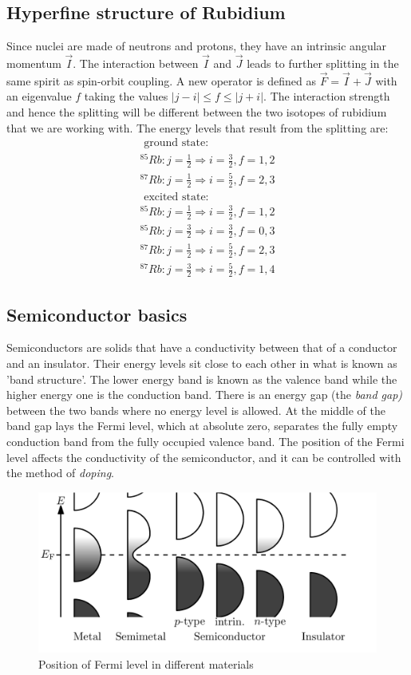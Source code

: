 \documentclass{article}
\begin{document}
\subsection{Hyperfine structure of Rubidium}

Since nuclei are made of neutrons and protons, they have an intrinsic angular momentum $\vec{I}$. The interaction between $\vec{I}$ and $\vec{J}$ leads to further splitting in the same spirit as spin-orbit coupling. A new operator is defined as $\vec{F} = \vec{I}+\vec{J}$ with an eigenvalue $f$ taking the values $|j-i| \leq f \leq|j+i|$. The interaction strength and hence the splitting will be different between the two isotopes of rubidium that we are working with. The energy levels that result from the splitting are: 
\begin{equation}
    \begin{gathered}
\text { ground state: } \\
{ }^{85} R b: j=\frac{1}{2} \Rightarrow i=\frac{3}{2}, f=1,2 \\
{ }^{87} R b: j=\frac{1}{2} \Rightarrow i=\frac{5}{2}, f=2,3 \\
\text { excited state: } \\
{ }^{85} R b: j=\frac{1}{2} \Rightarrow i=\frac{3}{2}, f=1,2 \\
{ }^{85} R b: j=\frac{3}{2} \Rightarrow i=\frac{3}{2}, f=0,3 \\
{ }^{87} R b: j=\frac{1}{2} \Rightarrow i=\frac{5}{2}, f=2,3 \\
{ }^{87} R b: j=\frac{3}{2} \Rightarrow i=\frac{5}{2}, f=1,4
\end{gathered}
\end{equation}

\subsection{Semiconductor basics}
Semiconductors are solids that have a conductivity between that of a conductor and an insulator. Their energy levels sit close to each other in what is known as 'band structure'. The lower energy band is known as the valence band while the higher energy one is the conduction band. There is an energy gap (the \textit{band gap)} between the two bands where no energy level is allowed. At the middle of the band gap lays the Fermi level, which at absolute zero, separates the fully empty conduction band from the fully occupied valence band. The position of the Fermi level affects the conductivity of the semiconductor, and it can be controlled with the method of \textit{doping}.
\begin{figure}[h]
    \centering
    \includegraphics[width=0.5\linewidth]{Figures/wiki2.png}
    \caption{Position of Fermi level in different materials \cite{wikipediacontributors_2019_semiconductor}}
    \label{fig:enter-label}
\end{figure}
\end{document}
